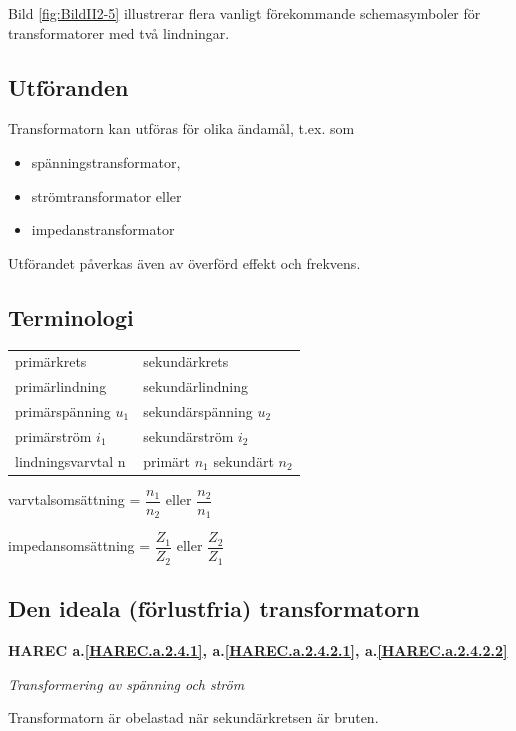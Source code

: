 Bild \ref{fig:BildII2-5} illustrerar flera vanligt förekommande schemasymboler
för transformatorer med två lindningar.

\subsection{Utföranden}

Transformatorn kan utföras för olika ändamål, t.ex. som
\begin{itemize}
\item spänningstransformator,
\item strömtransformator eller
\item impedanstransformator
\end{itemize}
Utförandet påverkas även av överförd effekt
och frekvens.

\subsection{Terminologi}

\begin{tabular}{ll}
primärkrets & sekundärkrets \\
primärlindning & sekundärlindning \\
primärspänning \(u_1\) &  sekundärspänning \(u_2\) \\
primärström \(i_1\) & sekundärström \(i_2\) \\
lindningsvarvtal n & primärt \(n_1\) sekundärt \(n_2\)
\end{tabular}

varvtalsomsättning = \(\dfrac{n_1}{n_2}\) eller \(\dfrac{n_2}{n_1}\)

impedansomsättning = \(\dfrac{Z_1}{Z_2}\) eller \(\dfrac{Z_2}{Z_1}\)

\subsection{Den ideala (förlustfria) transformatorn}
\textbf{HAREC a.\ref{HAREC.a.2.4.1}, a.\ref{HAREC.a.2.4.2.1},
a.\ref{HAREC.a.2.4.2.2}\label{myHAREC.a.2.4.1}
\label{myHAREC.a.2.4.2.1}\label{myHAREC.a.2.4.2.2}}

\emph{Transformering av spänning och ström}

Transformatorn är obelastad när sekundärkretsen är bruten.

